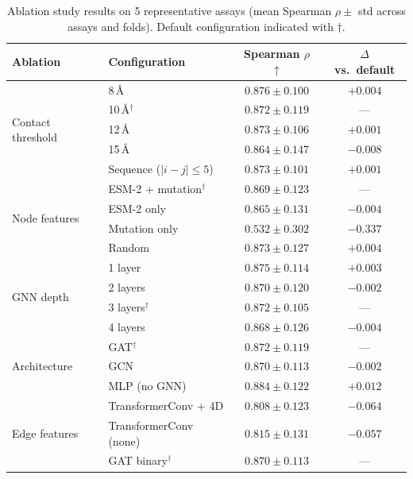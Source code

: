 \documentclass{article}
\newcommand{\spearman}{\rho}
\begin{document}
\begin{table}[t]
\caption{Ablation study results on 5 representative assays (mean Spearman $\spearman \pm$ std across assays and folds). Default configuration indicated with $\dagger$.}
\label{tab:ablations}
\centering
\small
\begin{tabular}{llcc}
\toprule
Ablation & Configuration & Spearman $\spearman$ $\uparrow$ & $\Delta$ vs.\ default \\
\midrule
\multirow{5}{*}{Contact threshold}
    & 8\,\AA{} & $0.876 \pm 0.100$ & $+0.004$ \\
    & 10\,\AA{}$^\dagger$ & $0.872 \pm 0.119$ & --- \\
    & 12\,\AA{} & $0.873 \pm 0.106$ & $+0.001$ \\
    & 15\,\AA{} & $0.864 \pm 0.147$ & $-0.008$ \\
    & Sequence ($|i{-}j| \leq 5$) & $0.873 \pm 0.101$ & $+0.001$ \\
\midrule
\multirow{4}{*}{Node features}
    & ESM-2 + mutation$^\dagger$ & $0.869 \pm 0.123$ & --- \\
    & ESM-2 only & $0.865 \pm 0.131$ & $-0.004$ \\
    & Mutation only & $0.532 \pm 0.302$ & $-0.337$ \\
    & Random & $0.873 \pm 0.127$ & $+0.004$ \\
\midrule
\multirow{4}{*}{GNN depth}
    & 1 layer & $\mathbf{0.875 \pm 0.114}$ & $+0.003$ \\
    & 2 layers & $0.870 \pm 0.120$ & $-0.002$ \\
    & 3 layers$^\dagger$ & $0.872 \pm 0.105$ & --- \\
    & 4 layers & $0.868 \pm 0.126$ & $-0.004$ \\
\midrule
\multirow{3}{*}{Architecture}
    & GAT$^\dagger$ & $0.872 \pm 0.119$ & --- \\
    & GCN & $0.870 \pm 0.113$ & $-0.002$ \\
    & MLP (no GNN) & $\mathbf{0.884 \pm 0.122}$ & $+0.012$ \\
\midrule
\multirow{3}{*}{Edge features}
    & TransformerConv + 4D & $0.808 \pm 0.123$ & $-0.064$ \\
    & TransformerConv (none) & $0.815 \pm 0.131$ & $-0.057$ \\
    & GAT binary$^\dagger$ & $0.870 \pm 0.113$ & --- \\
\bottomrule
\end{tabular}
\end{table}
\end{document}
